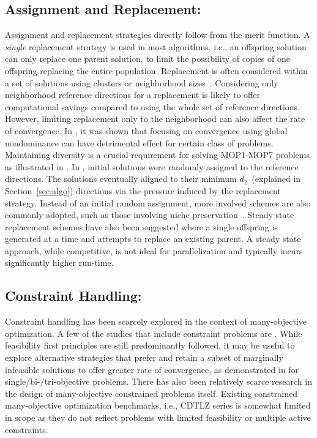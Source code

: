 \subsection{Assignment and Replacement:} Assignment and replacement strategies directly follow from the merit function. A \emph{single} replacement strategy is used in most algorithms, i.e., an offspring solution can only replace one parent solution, to limit the possibility of copies of one offspring replacing the entire population. Replacement is often considered within a set of solutions using clusters or neighborhood sizes~\cite{zhang2007moead,Wang2016adaptive}. Considering only neighborhood reference directions for a replacement is likely to offer computational savings compared to using the whole set of reference directions. However, limiting replacement only to the neighborhood can also affect the rate of convergence. In \cite{liu2014mop}, it was shown that focusing on convergence using global nondominance can have detrimental effect for certain class of problems. Maintaining diversity is a crucial requirement for solving MOP1-MOP7 problems as illustrated in \cite{liu2014mop}. In \cite{Asafmany2015}, initial solutions were randomly assigned to the reference directions. The solutions eventually aligned to their minimum $d_2$~(explained in Section~\ref{sec:algo}) directions via the pressure induced by the replacement strategy. Instead of an initial random assignment, more involved schemes are also commonly adopted, such as those involving niche preservation~\cite{Deb2014box}. Steady state replacement schemes have also been suggested where a single offspring is generated at a time and attempts to replace an existing parent. A steady state approach, while competitive, is not ideal for parallelization and typically incurs significantly higher run-time.

\subsection{Constraint Handling:} Constraint handling has been scarcely explored in the context of many-objective optimization. A few of the studies that include constraint problems are \cite{Asafmany2015, Deb2014adaptive,Cheng2016many}. While feasibility first principles are still predominantly followed, it may be useful to explore alternative strategies that prefer and retain a subset of marginally infeasible solutions to offer greater rate of convergence, as demonstrated in \cite{Ray2009idea} for single/bi-/tri-objective problems. There has also been relatively scarce research in the design of many-objective constrained problems itself. Existing constrained many-objective optimization benchmarks, i.e., CDTLZ series is somewhat limited in scope as they do not reflect problems with limited feasibility or multiple active constraints. 


